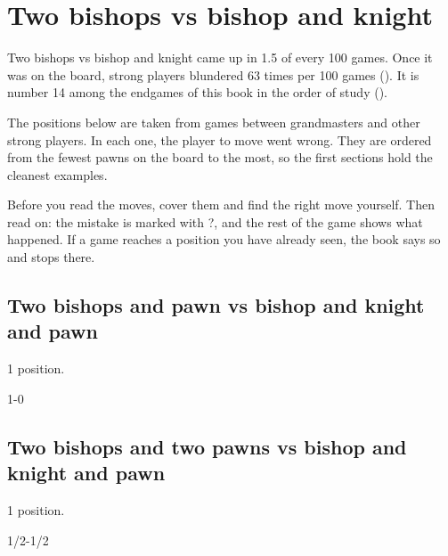 \chapter{Two bishops vs bishop and knight}\label{ch:two-bishops-vs-bishop-and-knight}
Two bishops vs bishop and knight came up in 1.5 of every 100 games. Once it was on the board, strong players blundered 63 times per 100 games (). It is number 14 among the endgames of this book in the order of study ().

The positions below are taken from games between grandmasters and other strong players. In each one, the player to move went wrong. They are ordered from the fewest pawns on the board to the most, so the first sections hold the cleanest examples.

Before you read the moves, cover them and find the right move yourself. Then read on: the mistake is marked with ?, and the rest of the game shows what happened. If a game reaches a position you have already seen, the book says so and stops there.


\section{Two bishops and pawn vs bishop and knight and pawn}
1 position.


1-0\par
\section{Two bishops and two pawns vs bishop and knight and pawn}
1 position.


1/2-1/2\par
